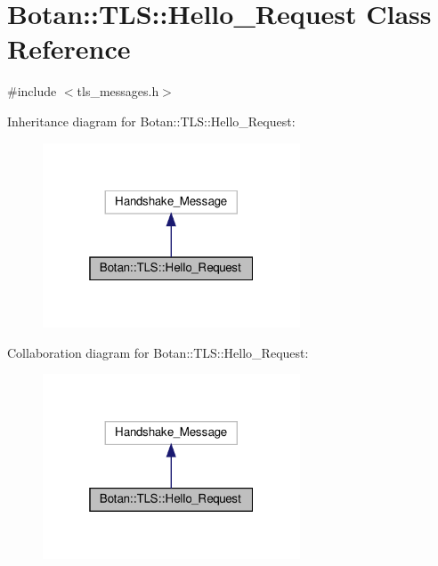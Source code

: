 \hypertarget{class_botan_1_1_t_l_s_1_1_hello___request}{}\section{Botan\+:\+:T\+LS\+:\+:Hello\+\_\+\+Request Class Reference}
\label{class_botan_1_1_t_l_s_1_1_hello___request}


{\ttfamily \#include $<$tls\+\_\+messages.\+h$>$}



Inheritance diagram for Botan\+:\+:T\+LS\+:\+:Hello\+\_\+\+Request\+:
\nopagebreak
\begin{figure}[H]
\begin{center}
\leavevmode
\includegraphics[width=217pt]{class_botan_1_1_t_l_s_1_1_hello___request__inherit__graph}
\end{center}
\end{figure}


Collaboration diagram for Botan\+:\+:T\+LS\+:\+:Hello\+\_\+\+Request\+:
\nopagebreak
\begin{figure}[H]
\begin{center}
\leavevmode
\includegraphics[width=217pt]{class_botan_1_1_t_l_s_1_1_hello___request__coll__graph}
\end{center}
\end{figure}
